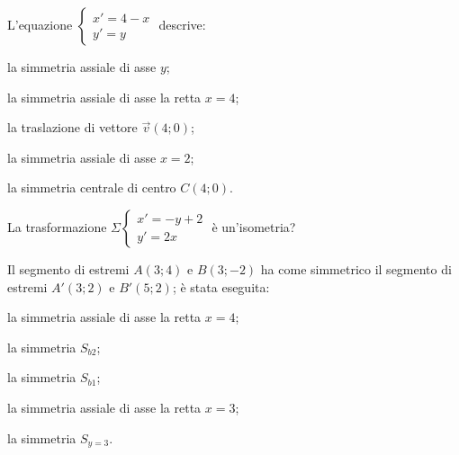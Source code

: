 \begin{esercizio}
\label{ese:8.87} %
L'equazione $\begin{cases}x'=4-x\\y'=y\end{cases}$ descrive: 
\begin{enumeratea}
\item la simmetria assiale di asse $y$;
\item la simmetria assiale di asse la retta $x=4$;
\item la traslazione di vettore $\vec{v}(4;0)$;
\item la simmetria assiale di asse $x=2$;
\item la simmetria centrale di centro $C(4;0)$.
\end{enumeratea}
\end{esercizio}

\begin{esercizio}
\label{ese:8.88} %
La trasformazione $\Sigma \begin{cases}x'=-y+2\\y'=2x\end{cases}$ è 
un'isometria?
\end{esercizio}

\begin{esercizio}
\label{ese:8.89} %
Il segmento di estremi $A(3;4)$ e $B(3;-2)$ ha come simmetrico il 
segmento di estremi $A'(3;2)$ e $B'(5;2)$; è stata eseguita:
\begin{enumeratea}
\item la simmetria assiale di asse la retta $x=4$;
\item la simmetria $S_{b2}$;
\item la simmetria $S_{b1}$;
\item la simmetria assiale di asse la retta $x=3$;
\item la simmetria $S_{y=3}$.
\end{enumeratea}
\end{esercizio}

